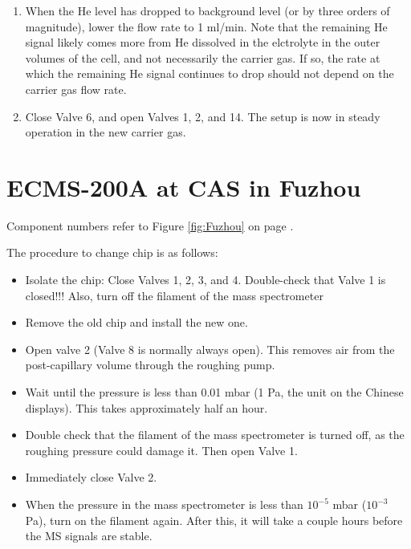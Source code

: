 \begin{enumerate}
	\item When the He level has dropped to background level (or by three orders of magnitude), lower the  flow rate to 1 ml/min. Note that the remaining He signal likely comes more from He dissolved in the elctrolyte in the outer volumes of the cell, and not necessarily the carrier gas. If so, the rate at which the remaining He signal continues to drop should not depend on the carrier gas flow rate.
	
	\item Close Valve 6, and open Valves 1, 2, and 14. The setup is now in steady operation in the new carrier gas.
	
\end{enumerate}


\section{ECMS-200A at CAS in Fuzhou}\label{app:Fuzhou}

Component numbers refer to Figure \ref{fig:Fuzhou} on page \pageref{fig:Fuzhou}.

The procedure to change chip is as follows:
\begin{itemize}
	\item Isolate the chip: Close Valves 1, 2, 3, and 4. Double-check that Valve 1 is closed!!! Also, turn off the filament of the mass spectrometer
	
	\item Remove the old chip and install the new one.
	
	\item Open valve 2 (Valve 8 is normally always open). This removes air from the post-capillary volume through the roughing pump.
	
	\item Wait until the pressure is less than 0.01 mbar (1 Pa, the unit on the Chinese displays). This takes approximately half an hour.
	
	\item Double check that the filament of the mass spectrometer is turned off, as the roughing pressure could damage it. Then open Valve 1. 
	
	\item Immediately close Valve 2.
	
	\item When the pressure in the mass spectrometer is less than $10^{-5}$ mbar ($10^{-3}$ Pa), turn on the filament again. After this, it will take a couple hours before the MS signals are stable.	
\end{itemize}



